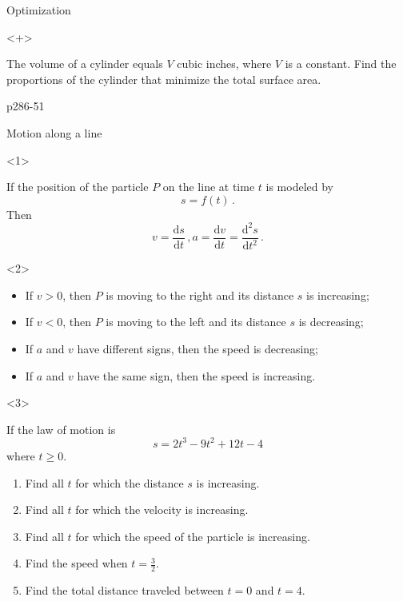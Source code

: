 \begin{frame}{Optimization}
\begin{onlyenv}<+>

\begin{example}
The volume of a cylinder equals $V$ cubic inches, where $V$ is a
constant. Find the proportions of the cylinder that minimize the total
surface area.
\end{example}



\begin{example}
p286-51
\end{example}

\end{onlyenv}

\end{frame}

\begin{frame}{Motion along a line}

\begin{onlyenv}<1>


If the position of the particle $P$ on the line at time $t$ is modeled
by
\[
s=f\left(t\right)\,.
\]
Then
\[
v=\frac{\mathrm{d}s}{\mathrm{d}t}\,,a=\frac{\mathrm{d}v}{\mathrm{d}t}=\frac{\mathrm{d}^{2}s}{\mathrm{d}t^{2}}\,.
\]


\end{onlyenv}



\begin{onlyenv}<2>

\begin{itemize}
\item If $v>0$, then $P$ is moving to the right and its distance $s$
is increasing;
\item If $v<0$, then $P$ is moving to the left and its distance $s$ is
decreasing;
\item If $a$ and $v$ have different signs, then the speed is decreasing;
\item If $a$ and $v$ have the same sign, then the speed is increasing.
\end{itemize}
\end{onlyenv}



\begin{onlyenv}<3>

\begin{example}
If the law of motion is
\[
s=2t^{3}-9t^{2}+12t-4
\]
where $t\ge0$.
\begin{enumerate}
\item Find all $t$ for which the distance $s$ is increasing.
\item Find all $t$ for which the velocity is increasing.
\item Find all $t$ for which the speed of the particle is increasing.
\item Find the speed when $t=\frac{3}{2}$.
\item Find the total distance traveled between $t=0$ and $t=4$.
\end{enumerate}


\end{example}
\end{onlyenv}
\end{frame}
